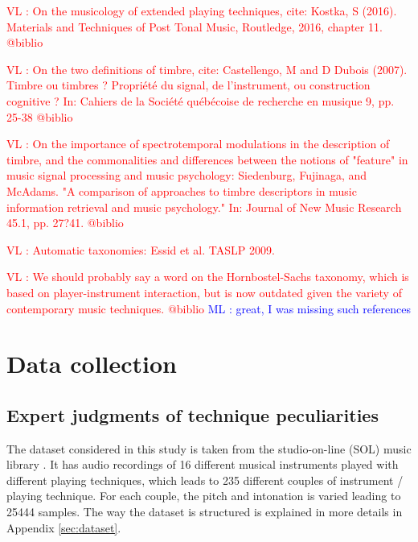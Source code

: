 \documentclass{article}
\newcommand{\ml}[1]{\textcolor{blue}{ML : #1}}
\newcommand{\vl}[1]{\textcolor{red}{VL : #1}}
\begin{document}
\vl{On the musicology of extended playing techniques, cite:
Kostka, S (2016). Materials and Techniques of Post Tonal Music, Routledge, 2016, chapter 11. @biblio}

\vl{On the two definitions of timbre, cite:
Castellengo, M and D Dubois (2007). Timbre ou timbres ? Propri\'{e}t\'{e}
du signal, de l'instrument, ou construction cognitive ? In: Cahiers
de la Soci\'{e}t\'{e} qu\'{e}b\'{e}coise de recherche en musique 9, pp. 25-38
 @biblio}

\vl{On the importance of spectrotemporal modulations in the description
of timbre, and the commonalities and differences between the notions of
"feature" in music signal processing and music psychology:
Siedenburg, Fujinaga, and McAdams. "A comparison of
approaches to timbre descriptors in music information retrieval
and music psychology." In: Journal of New Music Research 45.1,
pp. 27?41. @biblio}

\vl{Automatic taxonomies: Essid et al. TASLP 2009.}

\vl{We should probably say a word on the Hornbostel-Sachs taxonomy,
which is based on player-instrument interaction, but is now outdated
given the variety of contemporary music techniques. @biblio}
\ml{great, I was missing such references}


\section{Data collection}\label{sec:xp1}


\subsection{Expert judgments of technique peculiarities}

The dataset considered in this study is taken
from the studio-on-line (SOL) music library  \cite{peeters2000instrument}.
It has audio recordings of 16 different musical instruments played
with different playing techniques,
which leads to 235 different couples of instrument / playing technique.
For each couple, the pitch and intonation is varied leading to 25444 samples.
The way the dataset is structured
is explained in more details in Appendix \ref{sec:dataset}.
\end{document}
